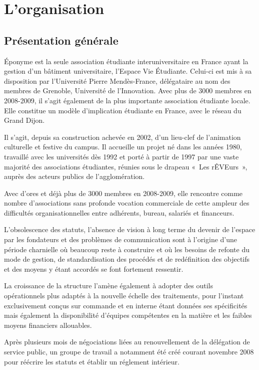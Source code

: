 \section{L'organisation}

\subsection{Présentation générale}
\label{presentation}

Éponyme est la seule association étudiante interuniversitaire en France
ayant la gestion d'un bâtiment universitaire, l'Espace Vie Étudiante.
Celui-ci est mis à sa disposition par l'Université Pierre Mendès-France,
délégataire au nom des membres de Grenoble, Université de l'Innovation.
Avec plus de 3000 membres en 2008-2009, il s'agit également de la plus
importante association étudiante locale. Elle constitue un modèle
d'implication étudiante en France, avec le réseau du Grand Dijon.

Il s'agit, depuis sa construction achevée en 2002, d'un lieu-clef de
l'animation culturelle et festive du campus. Il accueille un projet né
dans les années 1980, travaillé avec les universités dès 1992 et porté à
partir de 1997 par une vaste majorité des associations étudiantes,
réunies sous le drapeau «~Les rÊVEurs~», auprès des acteurs publics de
l'agglomération.

Avec d'ores et déjà plus de 3000 membres en 2008-2009, elle rencontre comme
nombre d'associations sans profonde vocation commerciale de cette ampleur des
difficultés organisationnelles entre adhérents, bureau, salariés et
financeurs.

L'obsolescence des statuts, l'absence de vision à long terme du devenir de l'espace
par les fondateurs et des problèmes de communication sont à l'origine d'une
période charnielle où beaucoup reste à construire et où les besoins de
refonte du mode de gestion, de standardisation des procédés et de redéfinition
des objectifs et des moyens y étant accordés se font fortement ressentir.

La croissance de la structure l'amène également à adopter des outils
o\-pé\-ra\-tion\-nels plus adaptés à la nouvelle échelle des traitements, pour
l'instant exclusivement conçus sur commande et en interne étant données ses
spécificités mais également la disponibilité d'équipes compétentes en la
matière et les faibles moyens financiers allouables.

Après plusieurs mois de négociations liées au renouvellement de la délégation
de service public, un groupe de travail a notamment été créé courant novembre
2008 pour réécrire les statuts et établir un réglement intérieur.

